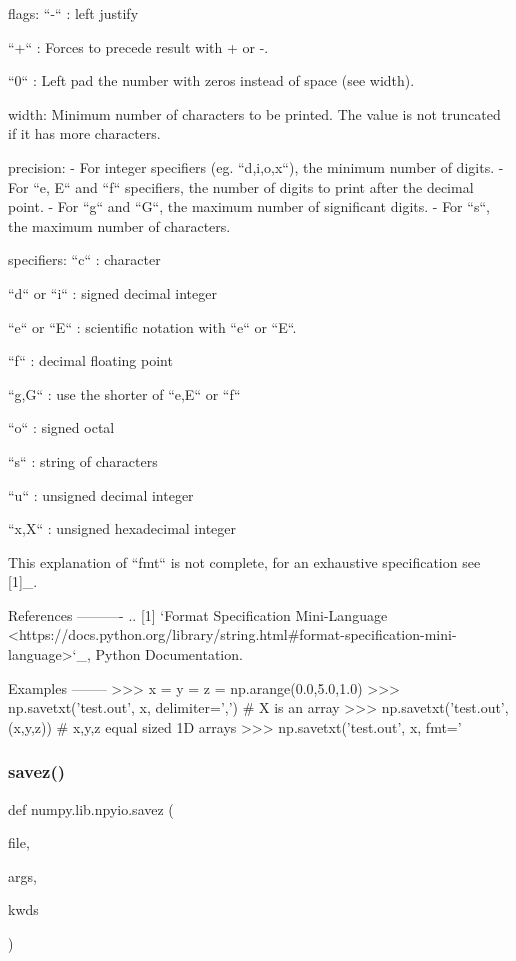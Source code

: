 \begin{DoxyVerb}
flags:
    ``-`` : left justify

    ``+`` : Forces to precede result with + or -.

    ``0`` : Left pad the number with zeros instead of space (see width).

width:
    Minimum number of characters to be printed. The value is not truncated
    if it has more characters.

precision:
    - For integer specifiers (eg. ``d,i,o,x``), the minimum number of
      digits.
    - For ``e, E`` and ``f`` specifiers, the number of digits to print
      after the decimal point.
    - For ``g`` and ``G``, the maximum number of significant digits.
    - For ``s``, the maximum number of characters.

specifiers:
    ``c`` : character

    ``d`` or ``i`` : signed decimal integer

    ``e`` or ``E`` : scientific notation with ``e`` or ``E``.

    ``f`` : decimal floating point

    ``g,G`` : use the shorter of ``e,E`` or ``f``

    ``o`` : signed octal

    ``s`` : string of characters

    ``u`` : unsigned decimal integer

    ``x,X`` : unsigned hexadecimal integer

This explanation of ``fmt`` is not complete, for an exhaustive
specification see [1]_.

References
----------
.. [1] `Format Specification Mini-Language
       <https://docs.python.org/library/string.html#format-specification-mini-language>`_,
       Python Documentation.

Examples
--------
>>> x = y = z = np.arange(0.0,5.0,1.0)
>>> np.savetxt('test.out', x, delimiter=',')   # X is an array
>>> np.savetxt('test.out', (x,y,z))   # x,y,z equal sized 1D arrays
>>> np.savetxt('test.out', x, fmt='%
 \mbox{\label{namespacenumpy_1_1lib_1_1npyio_a59b05b753a01baf0dd2f22c3ca3a0e57}} 
\subsubsection{\texorpdfstring{savez()}{savez()}}
{\footnotesize\ttfamily def numpy.\+lib.\+npyio.\+savez (\begin{DoxyParamCaption}\item[{}]{file,  }\item[{}]{args,  }\item[{}]{kwds }\end{DoxyParamCaption})}


\end{DoxyVerb}
